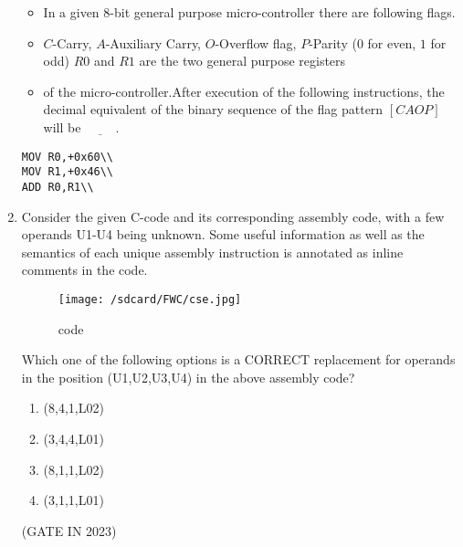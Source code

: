 
\begin{enumerate}
\begin{itemize}
\item 
In a given $8$-bit general purpose micro-controller there are following flags.
\item
$C$-Carry, $A$-Auxiliary Carry, $O$-Overflow flag, $P$-Parity ($0$ for even, $1$ for odd) $R0$ and $R1$ are the two general purpose registers 
\item
of the micro-controller.After execution of the following instructions, the decimal equivalent of the binary sequence of the flag pattern $[CAOP]$ will be $\underline{\hspace{1cm}}$.
\end{itemize}

\begin{lstlisting}
MOV R0,+0x60\\
MOV R1,+0x46\\
ADD R0,R1\\
\end{lstlisting}
    
\item
\label{prob:gate in 41}
Consider the given C-code and its corresponding assembly code, with a few operands U1-U4 being unknown. Some useful information as well as the semantics of each unique assembly instruction is annotated as inline comments in the code.

\begin{figure}
\centering                          
\texttt{[image: /sdcard/FWC/cse.jpg]}        
\caption{code}                     
\label{fig:code}
\end{figure}

Which one of the following options is a CORRECT replacement for operands in the position (U1,U2,U3,U4) in the above assembly code?                     
\begin{enumerate}[label=(\Alph*)]  
\item (8,4,1,L02)                  
\item (3,4,4,L01)
\item (8,1,1,L02)                  
\item (3,1,1,L01)                  
\end{enumerate}

\hfill(GATE IN 2023)

\end{enumerate}                    
